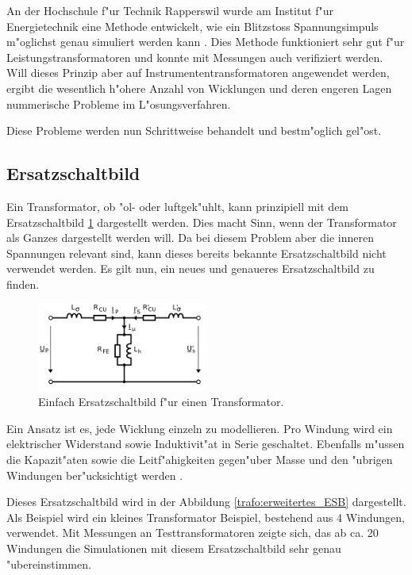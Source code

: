 \begin{refsection}
An der Hochschule f"ur Technik Rapperswil wurde am Institut f"ur Energietechnik eine Methode entwickelt, wie ein Blitzstoss Spannungsimpuls m"oglichst genau simuliert werden kann \cite{trafo:BILImpulse}. Dies Methode funktioniert sehr gut f"ur Leistungstransformatoren und konnte mit Messungen auch verifiziert werden. 
Will dieses Prinzip aber auf Instrumententransformatoren angewendet werden, ergibt die wesentlich h"ohere Anzahl von Wicklungen und deren engeren Lagen nummerische Probleme im L"osungsverfahren. 

Diese Probleme werden nun Schrittweise behandelt und bestm"oglich gel"ost. 


\subsection{Ersatzschaltbild}
Ein Transformator, ob "ol- oder luftgek"uhlt, kann prinzipiell mit dem Ersatzschaltbild \ref{trafo:einfaches_ESB} dargestellt werden. Dies macht Sinn, wenn der Transformator als Ganzes dargestellt werden will. Da bei diesem Problem aber die inneren Spannungen relevant sind, kann dieses bereits bekannte Ersatzschaltbild nicht verwendet werden. Es gilt nun, ein neues und genaueres Ersatzschaltbild zu finden. 

\begin{figure}
	\centering
	\includegraphics[width=0.5\textwidth]{trafo/Einfaches_ESB.png}
	\caption[Einfach Ersatzschaltbild f"ur einen Transformator]{Einfach Ersatzschaltbild f"ur einen Transformator.}
	\label{trafo:einfaches_ESB}
\end{figure}

Ein Ansatz ist es, jede Wicklung einzeln zu modellieren. Pro Windung wird ein elektrischer Widerstand sowie Induktivit"at in Serie geschaltet. Ebenfalls m"ussen die Kapazit"aten sowie die Leitf"ahigkeiten gegen"uber Masse und den "ubrigen Windungen ber"ucksichtigt werden \cite{trafo:BILImpulse}. 

Dieses Ersatzschaltbild wird in der Abbildung \ref{trafo:erweitertes_ESB} dargestellt. Als Beispiel wird ein kleines Transformator Beispiel, bestehend aus 4 Windungen, verwendet. Mit Messungen an Testtransformatoren zeigte sich, das ab ca. 20 Windungen die Simulationen mit diesem Ersatzschaltbild sehr genau "ubereinstimmen. 


\end{refsection}
